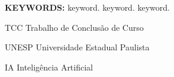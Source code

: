 \documentclass[
  12pt,		%
  a4paper,	%
  openright,%
  oneside,	%
  chapter=TITLE,		%
  section=TITLE,		%
  english,	%
  french,	%
  spanish,	%
  brazil	%
]{abntex2}
\begin{document}
    \begin{resumo}[Abstract] %
    
        \lipsum[1] %
        
        \vspace*{0.5cm}
        
        \noindent\textbf{\MakeUppercase{Keywords: }} keyword. keyword. keyword.
    
    \end{resumo}
    
    
    \listoffigures*
    \newpage
    
    
    \listoftables*
    \newpage
    
    
    \begin{siglas}
        \item[TCC] Trabalho de Conclusão de Curso
        \item[UNESP] Universidade Estadual Paulista
        \item[IA] Inteligência Artificial
    \end{siglas}
    
\end{document}
